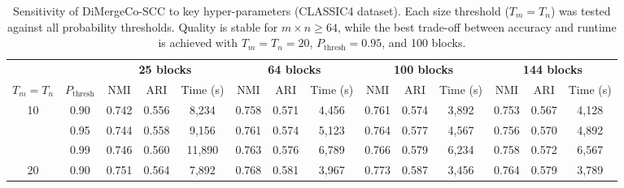 \documentclass[journal]{IEEEtran}
\theoremstyle{definition}
\theoremstyle{remark} %
\begin{document}
\begin{table}[t]
    \centering
    \caption{Sensitivity of DiMergeCo-SCC to key hyper-parameters (CLASSIC4 dataset). Each size threshold ($T_m=T_n$) was tested against all probability thresholds. Quality is stable for $m\times n\ge64$, while the best trade-off between accuracy and runtime is achieved with $T_m=T_n=20$, $P_{\text{thresh}}=0.95$, and 100 blocks.}
    \label{tab:param_sens}
    \begin{threeparttable}
        \begin{tabular}{cccccccccccccc}
            \toprule
                                &                     & \multicolumn{3}{c}{\textbf{25 blocks}} & \multicolumn{3}{c}{\textbf{64 blocks}} & \multicolumn{3}{c}{\textbf{100 blocks}} & \multicolumn{3}{c}{\textbf{144 blocks}}                                                                                                  \\
            \cmidrule(lr){3-5}\cmidrule(lr){6-8}\cmidrule(lr){9-11}\cmidrule(lr){12-14}
            $T_m{=}T_n$         & $P_{\text{thresh}}$ & NMI                                    & ARI                                    & Time (s)                                & NMI                                     & ARI   & Time (s) & NMI            & ARI            & Time (s)       & NMI   & ARI   & Time (s) \\
            \midrule
            \multirow{3}{*}{10} & 0.90                & 0.742                                  & 0.556                                  & 8,234                                   & 0.758                                   & 0.571 & 4,456    & 0.761          & 0.574          & 3,892          & 0.753 & 0.567 & 4,128    \\
                                & 0.95                & 0.744                                  & 0.558                                  & 9,156                                   & 0.761                                   & 0.574 & 5,123    & 0.764          & 0.577          & 4,567          & 0.756 & 0.570 & 4,892    \\
                                & 0.99                & 0.746                                  & 0.560                                  & 11,890                                  & 0.763                                   & 0.576 & 6,789    & 0.766          & 0.579          & 6,234          & 0.758 & 0.572 & 6,567    \\
            \midrule
            \multirow{3}{*}{20} & 0.90                & 0.751                                  & 0.564                                  & 7,892                                   & 0.768                                   & 0.581 & 3,967    & 0.773          & 0.587          & 3,456          & 0.764 & 0.579 & 3,789    \\

\end{tabular}
\end{threeparttable}
\end{table}
\end{document}
